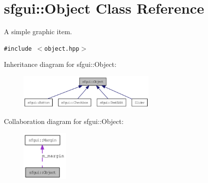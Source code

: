 \hypertarget{classsfgui_1_1Object}{
\section{sfgui::Object Class Reference}
\label{classsfgui_1_1Object}
}
A simple graphic item.  


{\tt \#include $<$object.hpp$>$}

Inheritance diagram for sfgui::Object:\nopagebreak
\begin{figure}[H]
\begin{center}
\leavevmode
\includegraphics[width=193pt]{classsfgui_1_1Object__inherit__graph}
\end{center}
\end{figure}
Collaboration diagram for sfgui::Object:\nopagebreak
\begin{figure}[H]
\begin{center}
\leavevmode
\includegraphics[width=65pt]{classsfgui_1_1Object__coll__graph}
\end{center}
\end{figure}
